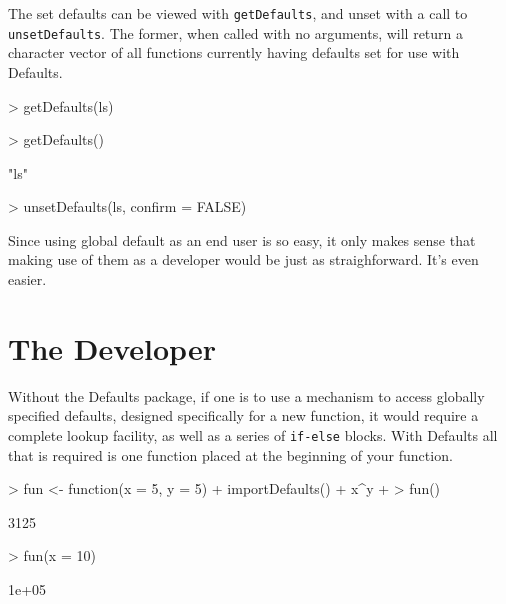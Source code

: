 \documentclass{article}
\begin{document}
\vspace{5mm}
\noindent
The set defaults can be viewed with {\tt getDefaults}, and unset with
a call to {\tt unsetDefaults}.  The former, when called with no
arguments, will return a character vector of all functions currently
having defaults set for use with {\sf Defaults}.

\begin{Schunk}
\begin{Sinput}
> getDefaults(ls)
\end{Sinput}
\begin{Sinput}
> getDefaults()
\end{Sinput}
\begin{Soutput}
[1] "ls"
\end{Soutput}
\begin{Sinput}
> unsetDefaults(ls, confirm = FALSE)
\end{Sinput}
\end{Schunk}

\vspace{2mm}
\noindent
Since using global default as an end user is so easy,
it only makes sense that making use of them as a
developer would be just as straighforward. It's even easier.

\section{The Developer}
Without the {\sf Defaults} package, if one is to use
a mechanism to access globally specified defaults, designed
specifically for a new function, it would require
a complete lookup facility, as well as a series of {\tt if-else}
blocks.  With {\sf Defaults} all that is required is one function
placed at the beginning of your function.

\begin{Schunk}
\begin{Sinput}
> fun <- function(x = 5, y = 5) {
+     importDefaults()
+     x^y
+ }
> fun()
\end{Sinput}
\begin{Soutput}
[1] 3125
\end{Soutput}
\begin{Sinput}
> fun(x = 10)
\end{Sinput}
\begin{Soutput}
[1] 1e+05
\end{Soutput}
\end{Schunk}
\end{document}
